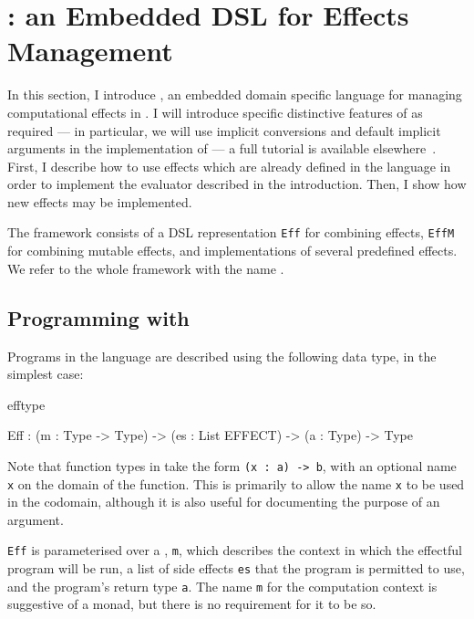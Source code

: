 \section{\Eff{}: an Embedded DSL for Effects Management} 

In this section, I introduce \Eff{}, an embedded domain specific language
for managing computational effects in \Idris{}. I will introduce specific
distinctive features of \Idris{} as required --- in particular, we will
use implicit conversions and default implicit arguments in the implementation
of \Eff{} --- a full tutorial is available elsewhere~\cite{idristutorial}.  
First, I describe how to
use effects which are already defined in the language in order to
implement the evaluator described in the introduction. Then, I show how new
effects may be implemented. 

The framework consists of a DSL representation \texttt{Eff} for combining
effects, \texttt{EffM} for combining mutable effects, and implementations
of several predefined effects. We refer to the whole framework with the
name \Eff{}.

\label{sect:effdsl}

\subsection{Programming with \Eff{}}

Programs in the \Eff{} language are described using the following data type,
in the simplest case:

\begin{SaveVerbatim}{efftype}

Eff : (m  : Type -> Type) -> 
      (es : List EFFECT) -> (a  : Type) -> Type

\end{SaveVerbatim}

\noindent
Note that function types in \Idris{} take the form \texttt{(x : a) -> b}, with
an optional name \texttt{x} on the domain of the function. This is primarily
to allow the name \texttt{x} to be used in the codomain, although it is also
useful for documenting the purpose of an argument.

\texttt{Eff} is parameterised over a , \texttt{m}, which
describes the context in which the effectful program will be run, a list
of side effects \texttt{es} that the program is permitted to use, 
and the program's return type \texttt{a}. The name \texttt{m} for the computation
context is suggestive of a monad,
but there is no requirement for it to be so.

